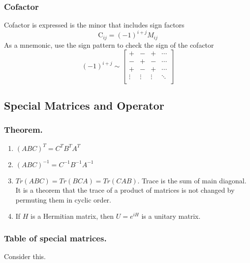 \documentclass[../main.tex]{subfiles}
\begin{document}
\subsubsection{Cofactor}
Cofactor is expressed is the minor that includes sign factors
\begin{equation*}
	\text{C}_{ij}=(-1)^{i+j}M_{ij}
\end{equation*}
As a mnemonic, use the sign pattern to check the sign of the cofactor
\begin{equation*}
	(-1)^{i+j}\sim
	\begin{bmatrix}
		+      & -      & +      & \cdots \\
		-      & +      & -      & \cdots \\
		+      & -      & +      & \cdots \\
		\vdots & \vdots & \vdots & \ddots \\
	\end{bmatrix}
\end{equation*}

\subsection{Special Matrices and Operator}
\subsubsection{Theorem.}
\begin{enumerate}
	\item $(ABC)^T=C^TB^TA^T$
	\item $(ABC)^{-1}=C^{-1}B^{-1}A^{-1}$
	\item $Tr(ABC)=Tr(BCA)=Tr(CAB)$.  Trace is the sum of main diagonal. It is a theorem that the
	      trace of a product of matrices is not changed by permuting them in cyclic order.
	\item If $H$ is a Hermitian matrix, then $U = e^{iH}$ is a unitary matrix.
\end{enumerate}

\subsubsection{Table of special matrices.} Consider this.
\end{document}
